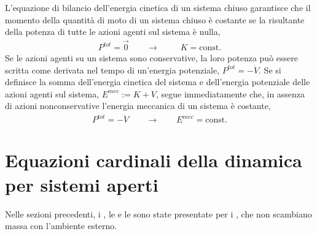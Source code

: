 \documentclass[letterpaper,10pt,italian]{jupyterBook}
\begin{document}
\sphinxAtStartPar
{}
L’equazione di bilancio dell’energia cinetica di un sistema chiuso garantisce che il momento della quantità di moto di un sistema chiuso è costante se la risultante della potenza di tutte le azioni agenti sul sistema è nulla,
\begin{equation*}
\begin{split}
  P^{tot} = \vec{0} \qquad  \rightarrow \qquad \ \  K = \text{const.}
\end{split}
\end{equation*}
\sphinxAtStartPar
{} Se le azioni agenti su un sistema sono conservative, la loro potenza può essere scritta come derivata nel tempo di un’energia potenziale, \(P^{tot} = - \dot{V}\). Se si definisce  la somma dell’energia cinetica del sistema e dell’energia potenziale delle azioni agenti sul sistema, \(E^{mec} := K + V\), segue immediatamente che, in assenza di azioni non\sphinxhyphen{}conservative l’energia meccanica di un sistema è costante,
\begin{equation*}
\begin{split}P^{tot} = - \dot{V} \qquad \rightarrow \qquad E^{mec} = \text{const.}\end{split}
\end{equation*}
\sphinxstepscope


\section{Equazioni cardinali della dinamica per sistemi aperti}
\label{\detokenize{ch/mechanics/dynamics-eom-open:equazioni-cardinali-della-dinamica-per-sistemi-aperti}}\label{\detokenize{ch/mechanics/dynamics-eom-open:physics-hs-mechanics-dynamics-eom-open}}\label{\detokenize{ch/mechanics/dynamics-eom-open::doc}}
\sphinxAtStartPar
Nelle sezioni precedenti, i {\hyperref[\detokenize{ch/mechanics/dynamics-eom:physics-hs-mechanics-dynamics-eom}]{}}, le {\hyperref[\detokenize{ch/mechanics/dynamics-eom:physics-hs-mechanics-dynamics-eom}]{}} e le {\hyperref[\detokenize{ch/mechanics/dynamics-conservation:physics-hs-mechanics-dynamics-conservation}]{}} sono state presentate per i , che non scambiano massa con l’ambiente esterno.
\end{document}
